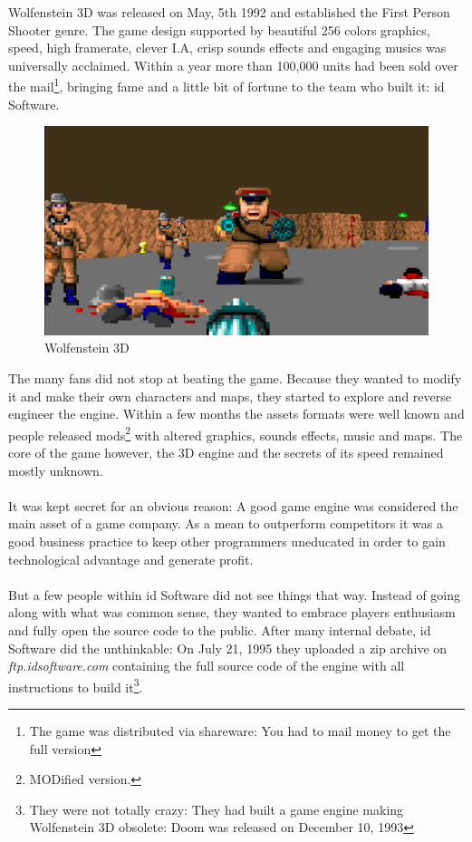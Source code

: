Wolfenstein 3D was released on May, 5th 1992 and established the First Person Shooter genre. The game design supported by beautiful 256 colors graphics, speed, high framerate, clever I.A, crisp sounds effects and engaging musics was universally acclaimed. Within a year more than 100,000 units had been sold over the mail\footnote{The game was distributed via shareware: You had to mail money to get the full version}, bringing fame and a little bit of fortune to the team who built it: id Software.\\
\par
 \begin{figure}[H]
\centering
      \includegraphics[width=\textwidth]{screenshots/action_packed.png}
       \caption{Wolfenstein 3D} 
\end{figure}
\par
The many fans did not stop at beating the game. Because they wanted to modify it and make their own characters and maps, they started to explore and reverse engineer the engine. Within a few months the assets formats were well known and people released mods\footnote{MODified version.} with altered graphics, sounds effects, music and maps. The core of the game however, the 3D engine and the secrets of its speed remained mostly unknown.\\
\\
It was kept secret for an obvious reason: A good game engine was considered the main asset of a game company. As a mean to outperform competitors it was a good business practice to keep other programmers  uneducated in order to gain technological advantage and generate profit.\\
\\
But a few people within id Software did not see things that way. Instead of going along with what was common sense, they wanted to embrace players enthusiasm and fully open the source code to the public. After many internal debate, id Software did the unthinkable: On July 21, 1995 they uploaded a zip archive on \emph{ftp.idsoftware.com} containing the full source code of the engine with all instructions to build it\footnote{They were not totally crazy: They had built a game engine making Wolfenstein 3D obsolete: Doom was released on December 10, 1993}.\\

